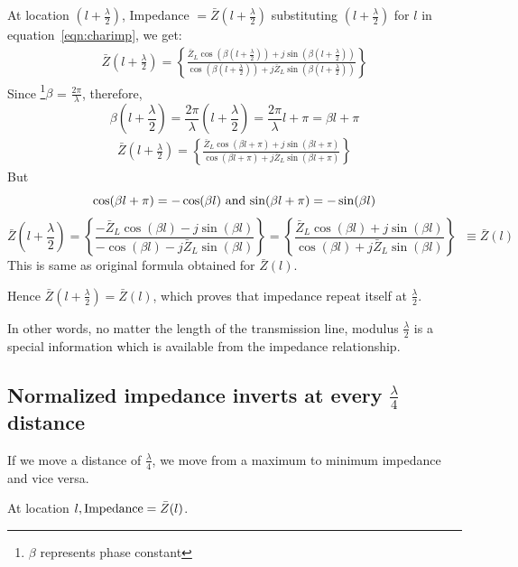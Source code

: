 At location ${\left(l+\frac{\lambda}{2}\right)}$, Impedance $= \bar{Z}\left(l+\frac{\lambda}{2}\right)$ substituting ${\left(l+\frac{\lambda}{2}\right)}$ for $l$ in equation~\ref{eqn:charimp}, we get: 
\begin{align*}
\bar{Z}\left(l+\frac{\lambda}{2}\right) = \left\lbrace \frac{\bar{Z}_L \cos(\beta \left(l+\frac{\lambda}{2}\right)) + j\sin(\beta \left(l+\frac{\lambda}{2}\right))}{\cos(\beta \left(l+\frac{\lambda}{2}\right)) + j\bar{Z}_L \sin(\beta \left(l+\frac{\lambda}{2}\right))}\right\rbrace 
\end{align*}
Since \footnote{$\beta$ represents phase constant}$\beta$ = $ \frac{2\pi}{\lambda}$, therefore,
\begin{dmath*}
\beta\left(l+\frac{\lambda}{2}\right)=\frac{2\pi}{\lambda}\left(l+\frac{\lambda}{2}\right)=\frac{2\pi}{\lambda}l+\pi=\beta l+\pi
\end{dmath*}
\begin{align*}
\bar{Z}\left(l+\frac{\lambda}{2}\right) = \left\lbrace \frac{\bar{Z}_L\cos(\beta l+\pi) + j\sin(\beta l+\pi)}{\cos(\beta l+\pi) + j\bar{Z}_L\sin(\beta l+\pi)}\right\rbrace 
\end{align*}
But 
\[
\cos(\beta l+\pi)=-\cos(\beta l)$ and $\sin(\beta l+\pi)=-\sin(\beta l)
\] 
\begin{dmath*}
\bar{Z}\left(l+\frac{\lambda}{2}\right)=\left\lbrace \frac{-\bar{Z}_L \cos(\beta l) - j\sin(\beta l)}{-\cos(\beta l) - j\bar{Z}_L \sin(\beta l)}\right\rbrace = \left\lbrace \frac{\bar{Z}_L \cos(\beta l) + j\sin(\beta l)}{\cos(\beta l) + j\bar{Z}_L \sin(\beta l)}\right\rbrace\;\;\equiv\bar{Z}(l)
\end{dmath*} 
This is same as original formula obtained for $\bar{Z}(l)$.

Hence $\bar{Z}\left(l+\frac{\lambda}{2}\right)=\bar{Z}(l)$, which proves that impedance repeat itself at $\frac{\lambda}{2}$.

In other words, no matter the length of the transmission line, modulus $\frac{\lambda}{2}$ is  a special information which is available from the impedance relationship.

\subsection{Normalized impedance inverts at every $\frac{\lambda}{4}$ distance}
If we move a distance of $\frac{\lambda}{4}$, we move from a maximum to minimum impedance and vice versa.

At location $l, \textnormal{Impedance}=\bar{Z}(l)$.

